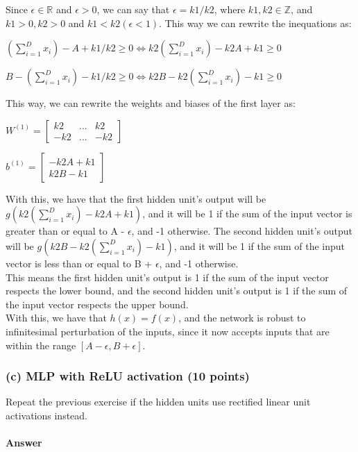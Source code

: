 \documentclass{article}
\begin{document}
Since $\epsilon \in \mathbb{R}$ and $\epsilon > 0$, we can say that $\epsilon = k1/k2$, where $k1, k2 \in \mathbb{Z}$, and $k1 > 0, k2 > 0$ and $k1 < k2
(\epsilon < 1)$.
This way we can rewrite the inequations as:

$(\sum_{i=1}^{D} x_i) - A + k1/k2 \geq 0 \iff k2(\sum_{i=1}^{D} x_i) - k2A + k1 \geq 0$

$B - (\sum_{i=1}^{D} x_i) - k1/k2 \geq 0 \iff k2B - k2(\sum_{i=1}^{D} x_i) - k1 \geq 0$

This way, we can rewrite the weights and biases of the first layer as:

\( W^{(1)} = \begin{bmatrix}
    k2  & ... & k2  \\
    -k2 & ... & -k2
\end{bmatrix}
\)

\(b^{(1)} = \begin{bmatrix}
    -k2A + k1 \\
    k2B - k1
\end{bmatrix}
\)

With this, we have that the first hidden unit's output will be $g(k2(\sum_{i=1}^{D} x_i) - k2A + k1)$, and it will be 1 if the sum of the 
input vector is greater than or equal to A - $\epsilon$, and -1 otherwise. The second hidden unit's output will be $g(k2B - k2(\sum_{i=1}^{D} x_i) - k1)$,
and it will be 1 if the sum of the input vector is less than or equal to B + $\epsilon$, and -1 otherwise. \\
This means the first hidden unit's output is 1 if the sum of the input vector respects the lower bound,
and the second hidden unit's output is 1 if the sum of the input vector respects the upper bound. \\
With this, we have that \(h(x) = f(x)\), and the network is robust to infinitesimal perturbation of the inputs, since it now accepts inputs
that are within the range \([A - \epsilon, B + \epsilon]\).

\subsubsection*{(c) MLP with ReLU activation (10 points)}

Repeat the previous exercise if the hidden units use rectified linear unit activations instead. 

\paragraph{Answer}
\end{document}
